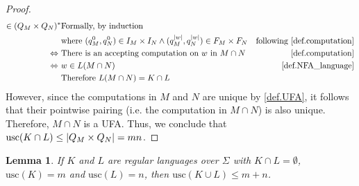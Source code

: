 \documentclass{report}
\DeclarePairedDelimiter{\abs}{\lvert}{\rvert}
\newtheorem{lemma}[theorem]{Lemma}
\theoremstyle{definition}
\begin{document}
\begin{proof}
\begin{align*}
\in (Q_M \times Q_N)^{\ast}
& \text{Formally, by induction} \\
& \text{where } (q_M^0, q_N^0) \in I_M \times I_N \wedge
(q_M^{\abs{w}}, q_N^{\abs{w}}) \in F_M \times F_N
& \text{following \cref{def.computation}} \\
\Leftrightarrow \ & \text{There is an accepting computation on } w
\text{ in } M \cap N
& \text{\cref{def.computation}} \\
\Leftrightarrow \ & w \in L(M \cap N)
& \text{\cref{def.NFA_language}} \\
& \text{Therefore } L(M \cap N) = K \cap L
\end{align*}
However, since the computations in $M$ and $N$ are unique by \cref{def.UFA},
it follows that their pointwise pairing (i.e. the computation in $M \cap N$) is
also unique. Therefore, $M \cap N$ is a UFA. Thus, we conclude that
$\mathrm{usc}(K \cap L) \leq \abs{Q_M \times Q_N} = mn$.
\end{proof}

\begin{lemma} \label{lma.disjoint_union_usc}
If $K$ and $L$ are regular languages over $\Sigma$ with $K \cap L = \emptyset$,
$\mathrm{usc}(K) = m$ and $\mathrm{usc}(L) = n$, then
$\mathrm{usc}(K \cup L) \leq m + n$.
\end{lemma}
\end{document}
